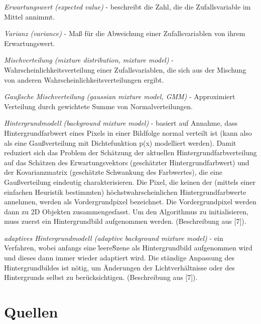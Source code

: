 \documentclass[10pt,a4paper]{article}
\begin{document}
\begin {description}
\item {\it Erwartungswert (expected value)} - beschreibt die Zahl, die die Zufallsvariable im Mittel annimmt. 

\item {\it Varianz (variance)} - Maß für die Abweichung einer Zufallsvariablen von ihrem Erwartungswert. 

\item {\it Mischverteilung (mixture distribution, mixture model)} - Wahrscheinlichkeitsverteilung einer Zufallsvariablen, die sich aus der Mischung von anderen Wahrscheinlichkeitsverteilungen ergibt.

\item {\it Gaußsche Mischverteilung (gaussian mixture model, GMM)} - Approximiert Verteilung durch gewichtete Summe von Normalverteilungen.

\item {\it Hintergrundmodell (background mixture model)} - basiert auf Annahme, dass Hintergrundfarbwert eines Pixels in einer Bildfolge normal verteilt ist (kann also als eine Gaußverteilung mit Dichtefunktion p(x) modelliert werden). Damit reduziert sich das Problem der Schätzung der aktuellen Hintergrundfarbverteilung auf das Schätzen des Erwartungsvektors (geschätzter Hintergrundfarbwert) und der Kovarianzmatrix (geschätzte Schwankung des Farbwertes), die eine Gaußverteilung eindeutig charakterisieren. Die Pixel, die keinen der (mittels einer einfachen Heuristik bestimmten) höchstwahrscheinlichen Hintergrundfarbwerte annehmen, werden als Vordergrundpixel bezeichnet. Die Vordergrundpixel werden dann zu 2D Objekten zusammengesfasst. Um den Algorithmus zu initialisieren, muss zuerst ein Hintergrundbild aufgenommen werden. (Beschreibung aus [7]).

\item {\it adaptives Hintergrundmodell (adaptive background mixture model)} - ein Verfahren, wobei anfangs eine \"leere\" Szene als Hintergrundbild aufgenommen wird und dieses dann immer wieder adaptiert wird. Die ständige Anpassung des Hintergrundbildes ist nötig, um Änderungen der Lichtverhältnisse oder des Hintergrunds selbst zu berücksichtigen. (Beschreibung aus [7]).

\end {description}

\newpage
\section{Quellen} 
\end{document}
